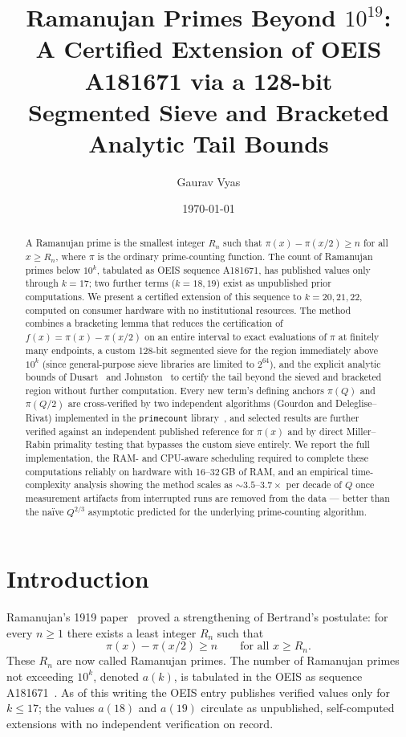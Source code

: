 \documentclass[11pt]{amsart}
\title[Ramanujan Primes Beyond $10^{19}$]{%
Ramanujan Primes Beyond $10^{19}$:\\
A Certified Extension of OEIS A181671 via a 128-bit\\
Segmented Sieve and Bracketed Analytic Tail Bounds}
\author{Gaurav Vyas}
\date{\today}
\newcommand{\pcount}{\pi}
\begin{document}
\begin{abstract}
A Ramanujan prime is the smallest integer $R_n$ such that
$\pcount(x) - \pcount(x/2) \geq n$ for all $x \geq R_n$, where $\pcount$ is
the ordinary prime-counting function. The count of Ramanujan primes below
$10^k$, tabulated as OEIS sequence A181671, has published values only
through $k=17$; two further terms ($k=18,19$) exist as unpublished prior
computations. We present a certified extension of this sequence to
$k=20,21,22$, computed on
consumer hardware with no institutional resources. The method combines
a bracketing lemma that reduces the certification of $f(x) = \pcount(x) -
\pcount(x/2)$ on an entire interval to exact evaluations of $\pcount$ at
finitely many endpoints, a custom 128-bit segmented sieve for the region
immediately above $10^{k}$ (since general-purpose sieve libraries are
limited to $2^{64}$), and the explicit analytic bounds of
Dusart~\cite{dusart2010} and Johnston~\cite{johnston2022} to certify the
tail beyond the sieved and bracketed region without further computation.
Every new term's defining anchors $\pcount(Q)$ and $\pcount(Q/2)$ are
cross-verified by two independent algorithms (Gourdon and
Deleglise--Rivat) implemented in the \texttt{primecount}
library~\cite{primecount}, and selected results are further verified
against an independent published reference for $\pcount(x)$ and by direct
Miller--Rabin primality testing that bypasses the custom sieve entirely.
We report the full implementation, the RAM- and CPU-aware scheduling
required to complete these computations reliably on hardware with
16--32\,GB of RAM, and an empirical time-complexity analysis showing the
method scales as $\sim\!3.5$--$3.7\times$ per decade of $Q$ once
measurement artifacts from interrupted runs are removed from the data
--- better than the na\"ive $Q^{2/3}$ asymptotic predicted for the
underlying prime-counting algorithm.
\end{abstract}

\maketitle

\section{Introduction}

Ramanujan's 1919 paper~\cite{ramanujan1919} proved a strengthening of
Bertrand's postulate: for every $n \geq 1$ there exists a least integer
$R_n$ such that
\[
  \pcount(x) - \pcount(x/2) \geq n \qquad \text{for all } x \geq R_n.
\]
These $R_n$ are now called Ramanujan primes. The number of Ramanujan
primes not exceeding $10^k$, denoted $a(k)$, is tabulated in the OEIS as
sequence A181671~\cite{oeisA181671}. As of this writing the OEIS entry
publishes verified values only for $k \leq 17$; the values $a(18)$ and
$a(19)$ circulate as unpublished, self-computed extensions with no
independent verification on record.
\end{document}
